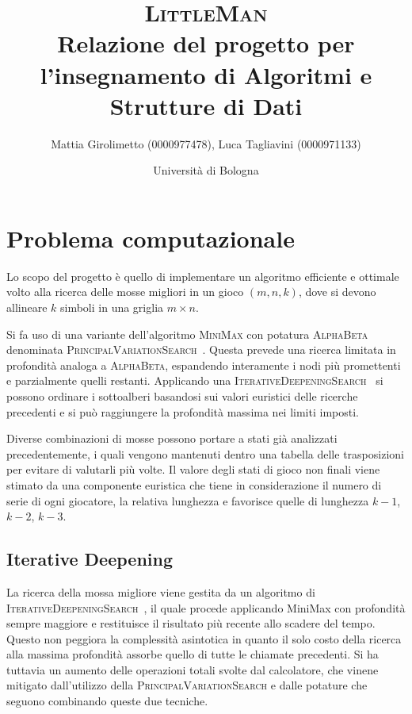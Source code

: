 \documentclass{article}
\title{\textsc{LittleMan}\\
\large Relazione del progetto per l'insegnamento di Algoritmi e Strutture di Dati}
\author{
  Mattia Girolimetto (0000977478),
  Luca Tagliavini (0000971133)
}
\date{
	Universit\`a di Bologna \\
  \displaydate{date}
}
\begin{document}
\maketitle

\section*{Problema computazionale}

Lo scopo del progetto \`e quello di implementare un algoritmo efficiente e ottimale
volto alla ricerca delle mosse migliori in un gioco $(m,n,k)$, dove si devono
allineare $k$ simboli in una griglia $m \times n$.

Si fa uso di una variante dell'algoritmo \textsc{MiniMax} con potatura
\textsc{AlphaBeta} denominata \textsc{PrincipalVariationSearch}~\cite{negascout}. Questa
prevede  una ricerca limitata in profondit\`a analoga a \textsc{AlphaBeta}, espandendo 
interamente i nodi pi\`u promettenti e parzialmente quelli restanti. Applicando
una \textsc{IterativeDeepeningSearch}~\cite{id} si possono ordinare i sottoalberi
basandosi sui valori euristici delle ricerche precedenti e si pu\`o raggiungere
la profondit\`a massima nei limiti imposti.

Diverse combinazioni di mosse possono portare a stati gi\`a analizzati
precedentemente, i quali vengono mantenuti dentro una tabella delle trasposizioni
per evitare di valutarli pi\`u volte. Il valore degli stati di gioco non finali
viene stimato da una componente euristica che tiene in considerazione il numero
di serie di ogni giocatore, la relativa lunghezza e favorisce quelle di lunghezza
$k-1$, $k-2$, $k-3$.

\subsection*{Iterative Deepening}

La ricerca della mossa migliore viene gestita da un algoritmo di
\textsc{IterativeDeepeningSearch}~\cite{id}, il quale procede applicando MiniMax
con profondit\`a sempre maggiore e restituisce il risultato pi\`u recente allo
scadere del tempo. Questo non peggiora la complessit\`a asintotica in quanto il
solo costo della ricerca alla massima profondit\`a assorbe quello di tutte
le chiamate precedenti. Si ha tuttavia un aumento delle operazioni totali svolte
dal calcolatore, che vinene mitigato dall'utilizzo della
\textsc{PrincipalVariationSearch} e dalle potature che seguono combinando queste
due tecniche.
\end{document}
